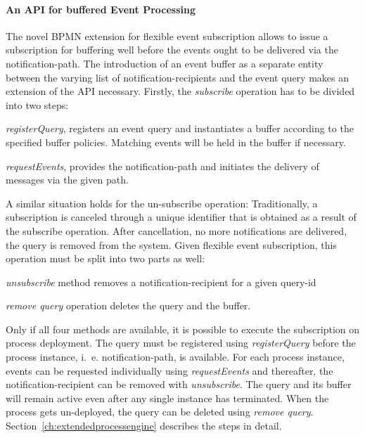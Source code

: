 \paragraph{An API for buffered Event Processing}
The novel BPMN extension for flexible event subscription allows to issue a subscription for buffering well before the events ought to be delivered via the notification-path. The introduction of an event buffer as a separate entity between the varying list of notification-recipients and the event query makes an extension of the API necessary.
Firstly, the \textit{subscribe} operation has to be divided into two steps:

\begin{aenumerate}
	\item \textit{registerQuery}, registers an event query and instantiates a buffer according to the specified buffer policies. Matching events will be held in the buffer if necessary.
	\item \textit{requestEvents}, provides the notification-path and initiates the delivery of messages via the given path.
\end{aenumerate}\label{def:apiextension-subscribe}

A similar situation holds for the un-subscribe operation: Traditionally, a subscription is canceled through a unique identifier that is obtained as a result of the subscribe operation. After cancellation, no more notifications are delivered, the query is removed from the system.
Given flexible event subscription, this operation must be split into two parts as well:

\begin{aenumerate}
	\item \textit{unsubscribe} method removes a notification-recipient for a given query-id
	\item \textit{remove query} operation deletes the query and the buffer.
\end{aenumerate}\label{def:apiextension-unsubscribe}

Only if all four methods are available, it is possible to execute the subscription on process deployment.
The query must be registered using \textit{registerQuery} before the process instance, i.~e. notification-path, is available. For each process instance, events can be requested individually using \textit{requestEvents} and thereafter, the notification-recipient can be removed with \textit{unsubscribe}.
The query and its buffer will remain active even after any single instance has terminated. When the process gets un-deployed, the query can be deleted using \textit{remove query}.
Section~\autoref{ch:extendedprocessengine} describes the steps in detail.


